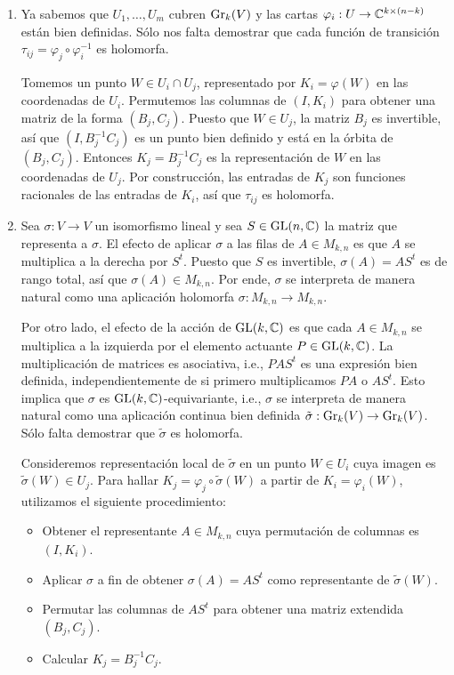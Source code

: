 \begin{solution}
\leavevmode
\begin{enumerate}[label=\alph*)]
    \item Ya sabemos que $U_1, \dots, U_m$ cubren $\operatorname{Gr}_k(V)$ y las cartas $\varphi_i : U \to \mathbb C^{k \times (n-k)}$ están bien definidas. Sólo nos falta demostrar que cada función de transición $\tau_{ij} = \varphi_j \circ \varphi_i^{-1}$ es holomorfa.
    
    Tomemos un punto $W \in U_i \cap U_j$, representado por $K_i = \varphi(W)$ en las coordenadas de $U_i$. Permutemos las columnas de $(I, K_i)$ para obtener una matriz de la forma $(B_j, C_j)$. Puesto que $W \in U_j$, la matriz $B_j$ es invertible, así que $(I, B_j^{-1} C_j)$ es un punto bien definido y está en la órbita de $(B_j, C_j)$. Entonces $K_j = B_j^{-1} C_j$ es la representación de $W$ en las coordenadas de $U_j$. Por construcción, las entradas de $K_j$ son funciones racionales de las entradas de $K_i$, así que $\tau_{ij}$ es holomorfa.
    
    \item Sea $\sigma : V \to V$ un isomorfismo lineal y sea $S \in \operatorname{GL}(n, \mathbb C)$ la matriz que representa a $\sigma$. El efecto de aplicar $\sigma$ a las filas de $A \in M_{k,n}$ es que $A$ se multiplica a la derecha por $S^t$. Puesto que $S$ es invertible, $\sigma(A) = AS^t$ es de rango total, así que $\sigma(A) \in M_{k,n}$. Por ende, $\sigma$ se interpreta de manera natural como una aplicación holomorfa $\sigma : M_{k,n} \to M_{k,n}$.
    
    Por otro lado, el efecto de la acción de $\operatorname{GL}(k, \mathbb C)$ es que cada $A \in M_{k,n}$ se multiplica a la izquierda por el elemento actuante $P \in \operatorname{GL}(k, \mathbb C)$. La multiplicación de matrices es asociativa, i.e., $PAS^t$ es una expresión bien definida, independientemente de si primero multiplicamos $PA$ o $AS^t$. Esto implica que $\sigma$ es $\operatorname{GL}(k, \mathbb C)$-equivariante, i.e., $\sigma$ se interpreta de manera natural como una aplicación continua bien definida $\tilde \sigma : \operatorname{Gr}_k(V) \to \operatorname{Gr}_k(V)$. Sólo falta demostrar que $\tilde \sigma$ es holomorfa.
    
    Consideremos representación local de $\tilde \sigma$ en un punto $W \in U_i$ cuya imagen es $\tilde \sigma(W) \in U_j$. Para hallar $K_j = \varphi_j \circ \tilde \sigma(W)$ a partir de $K_i = \varphi_i(W)$, utilizamos el siguiente procedimiento:
    \begin{itemize}
        \item Obtener el representante $A \in M_{k,n}$ cuya permutación de columnas es $(I, K_i)$.
        \item Aplicar $\sigma$ a fin de obtener $\sigma(A) = AS^t$ como representante de $\tilde \sigma(W)$.
        \item Permutar las columnas de $AS^t$ para obtener una matriz extendida $(B_j, C_j)$.
        \item Calcular $K_j = B_j^{-1} C_j$.
    \end{itemize}
    

\end{enumerate}
\end{solution}
